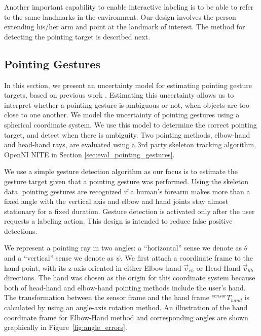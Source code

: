 \documentclass[3p]{elsarticle}
\begin{document}
Another important capability to enable interactive labeling is to be able to refer to the same landmarks in the environment. Our design involves the person extending his/her arm and point at the landmark of interest. The method for detecting the pointing target is described next.


\subsection{Pointing Gestures}
\label{sec:pointing_gestures}

In this section, we present an uncertainty model for estimating pointing gesture targets, based on previous work \cite{cosgun2015did}. Estimating this uncertainty allows us to interpret whether a pointing gesture is ambiguous or not, when objects are too close to one another. We model the uncertainty of pointing gestures using a spherical coordinate system. We use this model to determine the correct pointing target, and detect when there is ambiguity. Two pointing methods, elbow-hand and head-hand rays, are evaluated using a 3rd party skeleton tracking algorithm, OpenNI NITE in Section \ref{sec:eval_pointing_gestures}.

We use a simple gesture detection algorithm as our focus is to estimate the gesture target given that a pointing gesture was performed. Using the skeleton data, pointing gestures are recognized if a human's forearm makes more than a fixed angle with the vertical axis and elbow and hand joints stay almost stationary for a fixed duration. Gesture detection is activated only after the user requests a labeling action. This design is intended to reduce false positive detections.

We represent a pointing ray in two angles: a ``horizontal'' sense we denote as $\theta$ and a ``vertical'' sense we denote as $\psi$. We first attach a coordinate frame to the hand point, with its z-axis oriented in either Elbow-hand $\vec{v}_{eh}$ or Head-Hand $\vec{v}_{hh}$ directions. The hand was chosen as the origin for this coordinate system because both of head-hand and elbow-hand pointing methods include the user's hand. The transformation between the sensor frame and the hand frame $^{sensor}T_{hand}$ is calculated by using an angle-axis rotation method. An illustration of the hand coordinate frame for Elbow-Hand method and corresponding angles are shown graphically in Figure~\ref{fig:angle_errors}.
\end{document}
